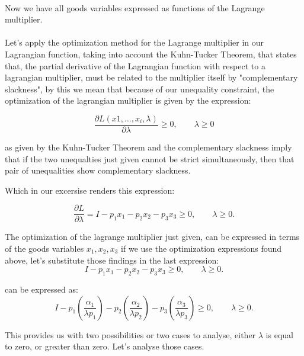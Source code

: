 \documentclass{article}
\begin{document}
\paragraph{}
Now we have all goods variables expressed as functions of the Lagrange multiplier.
\paragraph{}
 Let's apply the optimization method for the Lagrange multiplier in our Lagrangian function, taking into account the Kuhn-Tucker Theorem, that states that, the partial derivative of the Lagrangian function with respect to a lagrangian multiplier, must be related to the multiplier itself by "complementary slackness", by this we mean that because of our unequality constraint, the optimization of the lagrangian multiplier is given by the expression:

\begin{equation}
  \frac{\partial L(x1, ..., x_i, \lambda)}{\partial \lambda} \geq 0, \qquad \lambda \geq 0
\end{equation}

as given by the Kuhn-Tucker Theorem and the complementary slackness imply that if the two unequalties just given cannot be strict simultaneously, then that pair of unequalities show complementary slackness.

Which in our excersise renders this expression:

\begin{equation}\label{slk}
  \frac{\partial L}{\partial \lambda} = I - p_1x_1 - p_2x_2 - p_3x_3 \geq 0, \qquad \lambda \geq 0.
\end{equation}

The optimization of the lagrange multiplier just given, can be expressed in terms of the goods variables $x_1, x_2, x_3 $ if we use the optimization expressions found above, let's substitute those findings in the last expression:
\begin{equation}\label{cou}
   I - p_1x_1 - p_2x_2 - p_3x_3 \geq 0, \qquad \lambda \geq 0.
\end{equation}

can be expressed as:
\begin{equation}
   I - p_1 \left( \frac{\alpha_1}{\lambda p_1} \right) - p_2 \left( \frac{\alpha_2}{\lambda p_2} \right) - p_3 \left( \frac{\alpha_3}{\lambda p_3} \right) \geq 0, \qquad \lambda \geq 0.
\end{equation}

This provides us with two possibilities or two cases to analyse, either $\lambda$ is equal to zero, or greater than zero. Let's analyse those cases.
\end{document}
